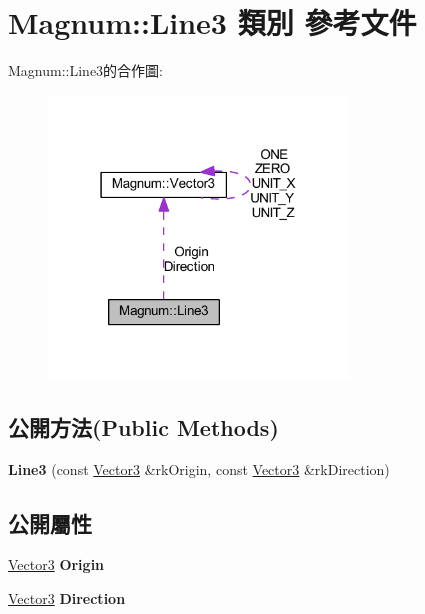 \hypertarget{class_magnum_1_1_line3}{}\section{Magnum\+:\+:Line3 類別 參考文件}
\label{class_magnum_1_1_line3}


Magnum\+:\+:Line3的合作圖\+:\nopagebreak
\begin{figure}[H]
\begin{center}
\leavevmode
\includegraphics[width=226pt]{class_magnum_1_1_line3__coll__graph}
\end{center}
\end{figure}
\subsection*{公開方法(Public Methods)}
\begin{DoxyCompactItemize}
\item 
{\bfseries Line3} (const \hyperlink{class_magnum_1_1_vector3}{Vector3} \&rk\+Origin, const \hyperlink{class_magnum_1_1_vector3}{Vector3} \&rk\+Direction)\hypertarget{class_magnum_1_1_line3_aa23f3e8213c9f504c6d3053d93cd968c}{}\label{class_magnum_1_1_line3_aa23f3e8213c9f504c6d3053d93cd968c}

\end{DoxyCompactItemize}
\subsection*{公開屬性}
\begin{DoxyCompactItemize}
\item 
\hyperlink{class_magnum_1_1_vector3}{Vector3} {\bfseries Origin}\hypertarget{class_magnum_1_1_line3_a68f2376221fa3a4b9bbf96cacddb29f0}{}\label{class_magnum_1_1_line3_a68f2376221fa3a4b9bbf96cacddb29f0}

\item 
\hyperlink{class_magnum_1_1_vector3}{Vector3} {\bfseries Direction}\hypertarget{class_magnum_1_1_line3_a0273ba38d40e7e8308fac2d75e491136}{}\label{class_magnum_1_1_line3_a0273ba38d40e7e8308fac2d75e491136}

\end{DoxyCompactItemize}


